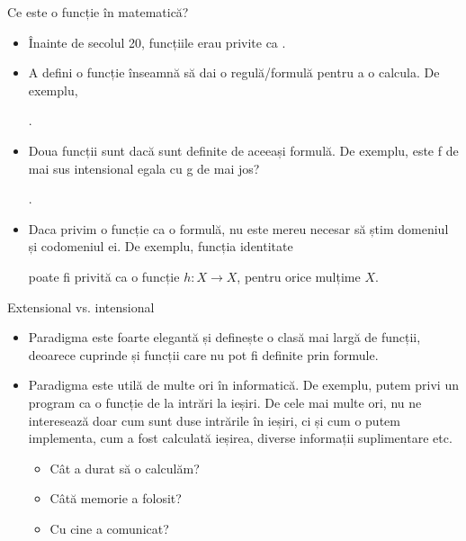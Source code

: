 \documentclass[xcolor=pdftex,romanian,colorlinks]{beamer}
\begin{document}
\begin{frame}{Ce este o funcție în matematică?}

\begin{itemize}
\item Înainte de secolul 20, funcțiile erau privite ca . 

\medskip
\item A defini o funcție înseamnă să dai  o regulă/formulă pentru a o calcula.
De exemplu,
\begin{center}
.
\end{center}  

\medskip
\item Doua funcții sunt   dacă sunt definite de aceeași formulă. De exemplu, este f de mai sus  intensional egala cu g de mai jos?
\begin{center}
.
\end{center}

\medskip
\item Daca privim o funcție ca o formulă, nu este mereu necesar să știm domeniul și codomeniul ei. De exemplu, funcția identitate
\begin{center}
\end{center}  
poate fi privită ca o funcție $h : X \to X$, pentru orice mulțime $X$.
\end{itemize}
\end{frame}

\begin{frame}{Extensional vs. intensional}

\begin{itemize}
\item Paradigma  este foarte elegantă și definește o clasă mai largă de funcții, deoarece cuprinde și funcții care nu pot fi definite prin formule.

\medskip
\item Paradigma  este utilă de multe ori în informatică. De exemplu, putem privi un program ca o funcție de la intrări la ieșiri. De cele mai multe ori, nu ne interesează doar cum sunt duse intrările în ieșiri, ci și cum o putem implementa, cum a fost calculată ieșirea, diverse informații suplimentare etc.
\begin{itemize}
	\item Cât a durat să o calculăm?
	\item Câtă memorie a folosit?
	\item Cu cine a comunicat?
\end{itemize}
\end{itemize}
\end{frame}
\end{document}
